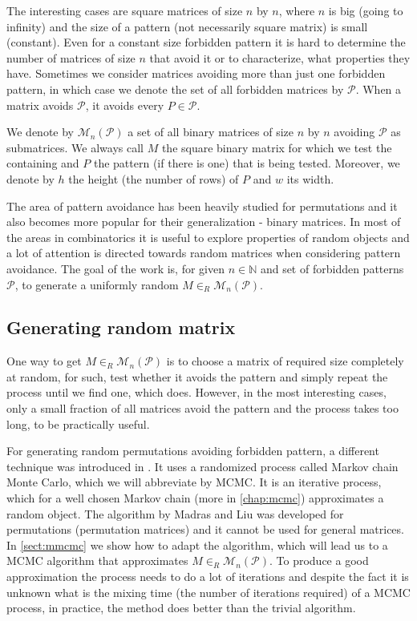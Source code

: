 The interesting cases are square matrices of size $n$ by $n$, where $n$ is big (going to infinity) and the size of a pattern (not necessarily square matrix) is small (constant). Even for a constant size forbidden pattern it is hard to determine the number of matrices of size $n$ that avoid it or to characterize, what properties they have. Sometimes we consider matrices avoiding more than just one forbidden pattern, in which case we denote the set of all forbidden matrices by $\mathcal{P}$. When a matrix avoids $\mathcal{P}$, it avoids every $P\in\mathcal{P}$. 
\begin{defn}
We denote by $\mathcal{M}_n(\mathcal{P})$ a set of all binary matrices of size $n$ by $n$ avoiding $\mathcal{P}$ as submatrices. We always call $M$ the square binary matrix for which we test the containing and $P$ the pattern (if there is one) that is being tested. Moreover, we denote by $h$ the height (the number of rows) of $P$ and $w$ its width.
\end{defn}
The area of pattern avoidance has been heavily studied for permutations and it also becomes more popular for their generalization - binary matrices. In most of the areas in combinatorics it is useful to explore properties of random objects and a lot of attention is directed towards random matrices when considering pattern avoidance. The goal of the work is, for given $n\in\mathbb{N}$ and set of forbidden patterns $\mathcal{P}$, to generate a uniformly random $M\in_R\mathcal{M}_n(\mathcal{P})$.
\subsection*{Generating random matrix}
One way to get $M\in_R\mathcal{M}_n(\mathcal{P})$ is to choose a matrix of required size completely at random, for such, test whether it avoids the pattern and simply repeat the process until we find one, which does. However, in the most interesting cases, only a small fraction of all matrices avoid the pattern and the process takes too long, to be practically useful.

For generating random permutations avoiding forbidden pattern, a different technique was introduced in \cite{MadrasLiu}. It uses a randomized process called Markov chain Monte Carlo, which we will abbreviate by MCMC. It is an iterative process, which for a well chosen Markov chain (more in \autoref{chap:mcmc}) approximates a random object. The algorithm by Madras and Liu was developed for permutations (permutation matrices) and it cannot be used for general matrices. In \autoref{sect:mmcmc} we show how to adapt the algorithm, which will lead us to a MCMC algorithm that approximates $M\in_R\mathcal{M}_n(\mathcal{P})$. To produce a good approximation the process needs to do a lot of iterations and despite the fact it is unknown what is the mixing time (the number of iterations required) of a MCMC process, in practice, the method does better than the trivial algorithm.
